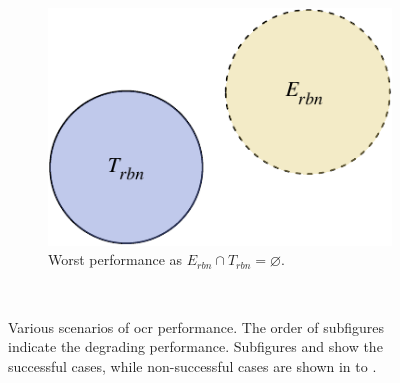 \begin{figure}[p]
\begin{subfigure}[b]{0.475\textwidth}
  \end{subfigure}
  \hspace{\fill} 
  \bigskip
  \\
  \begin{subfigure}[b]{0.475\textwidth}
    \includegraphics[width=\textwidth]{images/evaluation/set_explain/T_mutually_exclusive_E}
    \caption{Worst performance as $E_{rbn} \cap T_{rbn} = \varnothing$.}
    \label{fig:evaluation:metrics:character_rec:sets:worst}
  \end{subfigure}
  \bigskip
  \\
  \caption[Euler diagram to illustrate OCR performance]{Various scenarios of \gls{ocr} performance. The order of subfigures indicate the degrading performance. Subfigures  and  show the successful cases, while non-successful cases are shown in  to . }
  \label{fig:evaluation:metrics:character_rec:sets}
\end{figure}